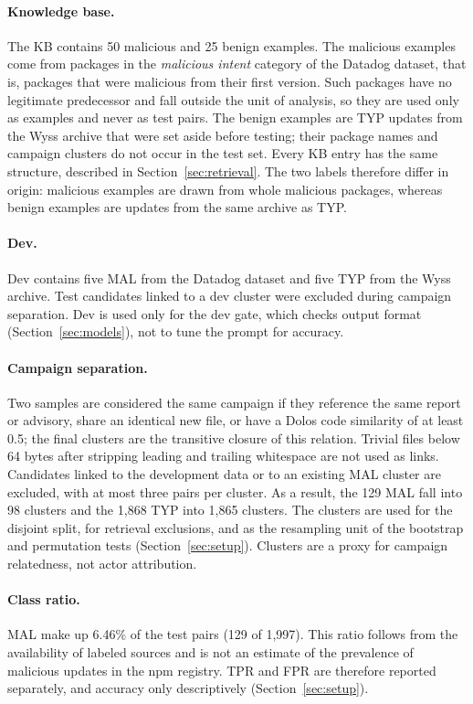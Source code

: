 \documentclass[a4paper,fleqn]{cas-dc}
\begin{document}
\paragraph{Knowledge base.} The KB contains 50 malicious and 25 benign
examples. The malicious examples come from packages in the \emph{malicious
intent} category of the Datadog dataset, that is, packages that were malicious
from their first version. Such packages have no legitimate predecessor and fall
outside the unit of analysis, so they are used only as examples and never as
test pairs. The benign examples are TYP updates from the Wyss archive that were
set aside before testing; their package names and campaign clusters do not
occur in the test set. Every KB entry has the same structure, described in
Section~\ref{sec:retrieval}. The two labels therefore differ in origin:
malicious examples are drawn from whole malicious packages, whereas benign
examples are updates from the same archive as TYP.

\paragraph{Dev.} Dev contains five MAL from the Datadog dataset and five TYP
from the Wyss archive. Test candidates linked to a dev cluster were excluded
during campaign separation. Dev is used only for the dev gate, which checks output format (Section~\ref{sec:models}),
not to tune the prompt for accuracy.

\paragraph{Campaign separation.} Two samples are considered the same campaign if
they reference the same report or advisory, share an identical new file, or have
a Dolos code similarity \citep{maertens2024dolos} of at least 0.5; the final
clusters are the transitive closure of this relation. Trivial files below 64
bytes after stripping leading and trailing whitespace are not used as links.
Candidates linked to the development data or to an existing MAL cluster are
excluded, with at most three pairs per cluster. As a result, the 129 MAL fall
into 98 clusters and the 1,868 TYP into 1,865 clusters. The clusters are used
for the disjoint split, for retrieval exclusions, and as the resampling unit of
the bootstrap and permutation tests (Section~\ref{sec:setup}). Clusters are a
proxy for campaign relatedness, not actor attribution.

\paragraph{Class ratio.} MAL make up 6.46\% of the test pairs (129 of 1,997).
This ratio follows from the availability of labeled sources and is not an
estimate of the prevalence of malicious updates in the npm registry. TPR and
FPR are therefore reported separately, and accuracy only descriptively
(Section~\ref{sec:setup}).
\end{document}

